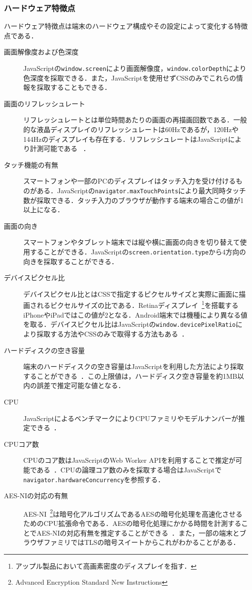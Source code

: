 \subsubsection{ハードウェア特徴点}
ハードウェア特徴点は端末のハードウェア構成やその設定によって変化する特徴点である．
\begin{description}
\item[画面解像度および色深度]JavaScriptの\texttt{window.screen}により画面解像度，\texttt{window.colorDepth}により色深度を採取できる．また，JavaScriptを使用せずCSSのみでこれらの情報を採取することもできる．
\item[画面のリフレッシュレート]リフレッシュレートとは単位時間あたりの画面の再描画回数である．一般的な液晶ディスプレイのリフレッシュレートは60Hzであるが，120Hzや144Hzのディスプレイも存在する．リフレッシュレートはJavaScriptにより計測可能である~\cite{takasu2015survey} ．
\item[タッチ機能の有無]スマートフォンや一部のPCのディスプレイはタッチ入力を受け付けるものがある．JavaScriptの\texttt{navigator.maxTouchPoints}により最大同時タッチ数が採取できる．タッチ入力のブラウザが動作する端末の場合この値が1以上になる．
\item[画面の向き]スマートフォンやタブレット端末では縦や横に画面の向きを切り替えて使用することができる．JavaScriptの\texttt{screen.orientation.type}から4方向の向きを採取することができる．
\item[デバイスピクセル比]デバイスピクセル比とはCSSで指定するピクセルサイズと実際に画面に描画されるピクセルサイズの比である．Retinaディスプレイ~\footnote{アップル製品において高画素密度のディスプレイを指す．}を搭載するiPhoneやiPadではこの値が2となる．Android端末では機種により異なる値を取る．デバイスピクセル比はJavaScriptの\texttt{window.devicePixelRatio}により採取する方法やCSSのみで取得する方法もある~\cite{takei2015web}． 
\item[ハードディスクの空き容量]端末のハードディスクの空き容量はJavaScriptを利用した方法により採取することができる~\cite{takasu2015survey}．この上限値は，ハードディスク空き容量を約1MB以内の誤差で推定可能な値となる．
\item[CPU]JavaScriptによるベンチマークによりCPUファミリやモデルナンバーが推定できる~\cite{saito2017web}．
\item[CPUコア数]CPUのコア数はJavaScriptのWeb Worker APIを利用することで推定が可能である~\cite{桐生直輝2014web}．CPUの論理コア数のみを採取する場合はJavaScriptで\texttt{navigator.hardwareConcurrency}を参照する．
\item[AES-NIの対応の有無]AES-NI~\footnote{Advanced Encryption Standard New Instructions}は暗号化アルゴリズムであるAESの暗号化処理を高速化させるためのCPU拡張命令である．AESの暗号化処理にかかる時間を計測することでAES-NIの対応有無を推定することができる~\cite{saito2016estimating}．また，一部の端末とブラウザファミリではTLSの暗号スイートからこれがわかることがある．

\end{description}
